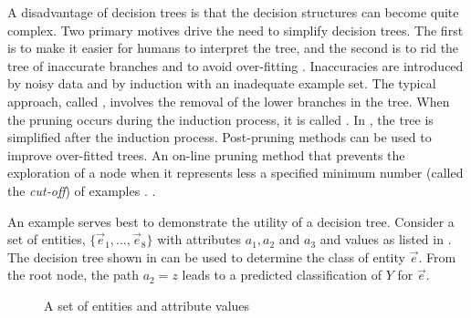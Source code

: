 A disadvantage of decision trees is that the decision structures can become quite complex. Two primary motives drive the need to simplify decision trees.  The first is to make it easier for humans to interpret the tree, and the second is to rid the tree of inaccurate branches and to avoid over-fitting \cite{kubat:review}.  Inaccuracies are introduced by noisy data and by induction with an inadequate example set.  The typical approach, called  , involves the removal of the lower branches in the tree. When the pruning occurs during the induction process, it is called .  In , the tree is simplified after the induction process.  Post-pruning methods can be used to improve over-fitted trees. 
 {An on-line pruning method that prevents the exploration of a node when it represents less a specified minimum number (called the \emph{cut-off}) of examples \cite{quinlan:c45}.   }. %

An example serves best to demonstrate the utility of a decision tree. Consider a set of entities, $\{\vec e_1,\ldots, \vec e_8\}$ with attributes $a_1,a_2$ and $a_3$ and values as listed in .  The decision tree shown in  can be used to determine the class of entity $\vec e$.  From the root node, the path $a_2 = z$ leads to a predicted classification of $Y$ for $\vec e$.  

\begin{figure} [!ht]
\centering
{}
\caption{A set of entities and attribute values}
\end{figure}

